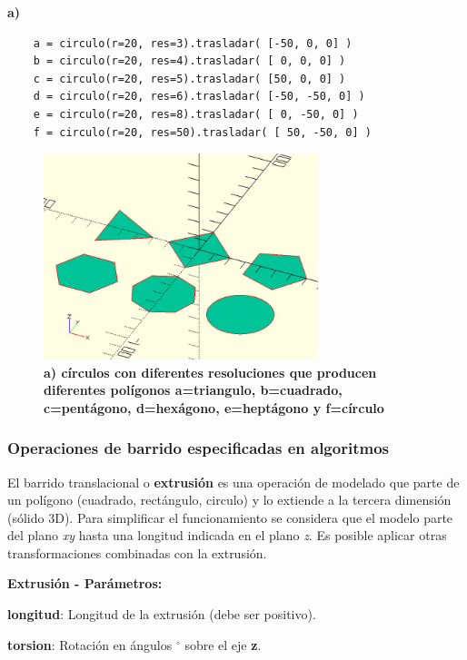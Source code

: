 \textbf{a)} 
\begin{listing}[ht]
\begin{verbatim}
    a = circulo(r=20, res=3).trasladar( [-50, 0, 0] )
    b = circulo(r=20, res=4).trasladar( [ 0, 0, 0] )
    c = circulo(r=20, res=5).trasladar( [50, 0, 0] )
    d = circulo(r=20, res=6).trasladar( [-50, -50, 0] )
    e = circulo(r=20, res=8).trasladar( [ 0, -50, 0] )
    f = circulo(r=20, res=50).trasladar( [ 50, -50, 0] )
\end{verbatim}
\end{listing}

\begin{figure}[h]
\includegraphics[width=8cm]{Img/Modelos/modelado18.jpg}
\centering
\caption{\textbf{\footnotesize{a) círculos con diferentes resoluciones que producen diferentes polígonos a=triangulo, b=cuadrado, c=pentágono, d=hexágono, e=heptágono y f=círculo  }}}
\end{figure}


\clearpage
\subsubsection{Operaciones de barrido especificadas en algoritmos}

El barrido translacional o \textbf{extrusión} es una operación de modelado que parte de un polígono (cuadrado, rectángulo, circulo) y lo extiende a la tercera dimensión (sólido 3D). Para simplificar el funcionamiento se considera que el modelo parte del plano \textit{xy} hasta una longitud indicada en el plano \textit{z}. Es posible aplicar otras transformaciones combinadas con la extrusión.

\begin{description}
\item  \textbf{Extrusión - Parámetros:}
\item  \textbf{longitud}: Longitud de la extrusión (debe ser positivo).
\item  \textbf{torsion}: Rotación en  ángulos $^\circ$ sobre el eje \textbf{z}.
\end{description}

